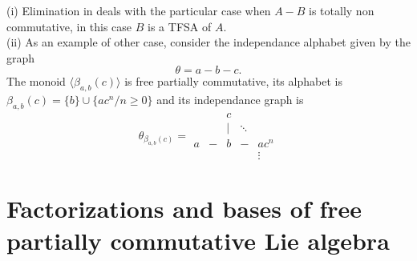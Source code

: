 \begin{remark}
(i) Elimination in \cite{DK2}   deals with the particular case when
$A-
B$ is totally non commutative, in this case $B$ is a TFSA of $A$.\\
(ii) As an example of other case, consider the independance alphabet given
by the graph\[\theta=a-b-c.\]
The monoid $\langle \beta_{a,b}(c)\rangle$ is free partially commutative,
its alphabet is $\beta_{a,b}(c)=\{b\}\cup\{ac^n/n\geq0\}$ and its
independance graph is
\[\theta_{\beta_{a,b}(c)}=\begin{array}{ccccc}
& &c&      & \\
& &|&\ddots& \\
a&-&b&-     &ac^n\\
& & &      &\vdots
\end{array}\]
\end{remark}

\section{Factorizations and bases of free partially commutative Lie
algebra}
